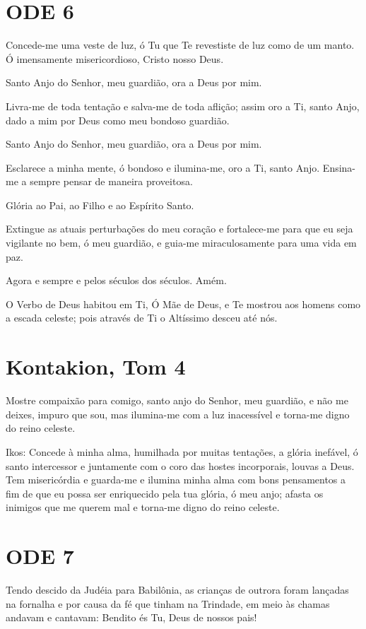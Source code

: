 \documentclass{subfiles}
\begin{document}
\section*{ODE 6}

\eirmos{}Concede-me uma veste de luz, ó Tu que Te revestiste de luz como de
um manto. Ó imensamente misericordioso, Cristo nosso Deus.

Santo Anjo do Senhor, meu guardião, ora a Deus por mim.

Livra-me de toda tentação e salva-me de toda aflição; assim oro a Ti,
santo Anjo, dado a mim por Deus como meu bondoso guardião.

Santo Anjo do Senhor, meu guardião, ora a Deus por mim.

Esclarece a minha mente, ó bondoso e ilumina-me, oro a Ti, santo
Anjo. Ensina-me a sempre pensar de maneira proveitosa.

Glória ao Pai, ao Filho e ao Espírito Santo.

Extingue as atuais perturbações do meu coração e fortalece-me para
que eu seja vigilante no bem, ó meu guardião, e guia-me miraculosamente
para uma vida em paz.

Agora e sempre e pelos séculos dos séculos. Amém.

O Verbo de Deus habitou em Ti, Ó Mãe de Deus, e Te mostrou aos
homens como a escada celeste; pois através de Ti o Altíssimo desceu até nós.

\section*{Kontakion, Tom 4}

Mostre compaixão para comigo, santo anjo do Senhor, meu
guardião, e não me deixes, impuro que sou, mas ilumina-me com a luz
inacessível e torna-me digno do reino celeste.

Ikos: Concede à minha alma, humilhada por muitas tentações, a glória inefável,
ó santo intercessor e juntamente com o coro das hostes incorporais, louvas a
Deus. Tem misericórdia e guarda-me e ilumina minha alma com bons
pensamentos a fim de que eu possa ser enriquecido pela tua glória, ó meu
anjo; afasta os inimigos que me querem mal e torna-me digno do reino celeste.

\section*{ODE 7}

\eirmos{}Tendo descido da Judéia para Babilônia, as crianças de outrora foram
lançadas na fornalha e por causa da fé que tinham na Trindade, em meio às
chamas andavam e cantavam: Bendito és Tu, Deus de nossos pais!
\end{document}
